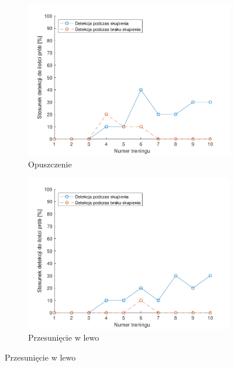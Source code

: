 \documentclass[skorowidz,skroty]{dyplomWEZUT}
\begin{document}
{\begin{figure}[htbp]
        \medskip
        \begin{subfigure}{0.49\textwidth}
        \includegraphics[width=\linewidth]{graphic/down}
        \caption{Opuszczenie\label{fig:training_emotiv_down}}
        \end{subfigure}\hspace*{\fill}
        \begin{subfigure}{0.49\textwidth}
        \includegraphics[width=\linewidth]{graphic/left}
        \caption{Przesunięcie w lewo\label{fig:training_emotiv_left}}
        \end{subfigure}
        

\end{figure}}
\end{document}
